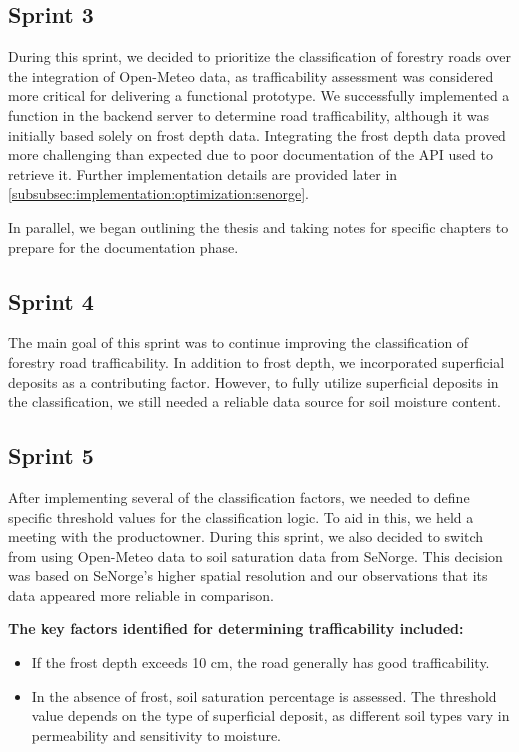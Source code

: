 \subsection*{Sprint 3}

During this sprint, we decided to prioritize the classification of forestry roads over the integration of Open-Meteo data, as trafficability assessment was considered more critical for delivering a functional prototype. We successfully implemented a function in the backend server to determine road trafficability, although it was initially based solely on frost depth data. Integrating the frost depth data proved more challenging than expected due to poor documentation of the API used to retrieve it. Further implementation details are provided later in \autoref{subsubsec:implementation:optimization:senorge}.

In parallel, we began outlining the thesis and taking notes for specific chapters to prepare for the documentation phase.

\subsection*{Sprint 4}

The main goal of this sprint was to continue improving the classification of forestry road trafficability. In addition to frost depth, we incorporated superficial deposits as a contributing factor. However, to fully utilize superficial deposits in the classification, we still needed a reliable data source for soil moisture content.

\subsection*{Sprint 5}

After implementing several of the classification factors, we needed to define specific threshold values for the classification logic. To aid in this, we held a meeting with the \gls{productowner}. During this sprint, we also decided to switch from using Open-Meteo data to soil saturation data from SeNorge. This decision was based on SeNorge's higher spatial resolution and our observations that its data appeared more reliable in comparison.

\textbf{The key factors identified for determining trafficability included:}

\begin{itemize}
    \item If the frost depth exceeds 10 cm, the road generally has good trafficability.
    \item In the absence of frost, soil saturation percentage is assessed. The threshold value depends on the type of superficial deposit, as different soil types vary in permeability and sensitivity to moisture.
\end{itemize}

